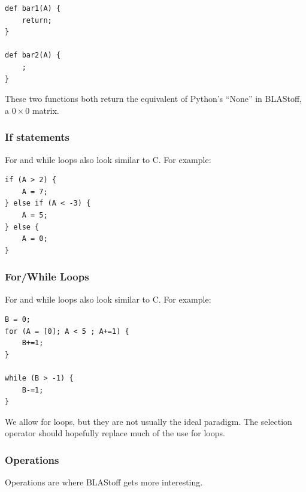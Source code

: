 \begin{lstlisting}
def bar1(A) {
    return;
}

def bar2(A) {
    ;
}
\end{lstlisting}
These two functions both return the equivalent of Python's ``None'' in BLAStoff, a $0\times 0$ matrix.

\subsubsection{If statements}
For and while loops also look similar to C.  For example:
\begin{lstlisting}
if (A > 2) {
    A = 7;
} else if (A < -3) {
    A = 5;
} else {
    A = 0;
}
\end{lstlisting}

\subsubsection{For/While Loops}
For and while loops also look similar to C.  For example:

\begin{lstlisting}
B = 0;
for (A = [0]; A < 5 ; A+=1) {
    B+=1;
}

while (B > -1) {
    B-=1;
}
\end{lstlisting}
We allow for loops, but they are not usually the ideal paradigm.  The selection operator should hopefully replace much of the use for loops.

\subsubsection{Operations}
Operations are where BLAStoff gets more interesting.

